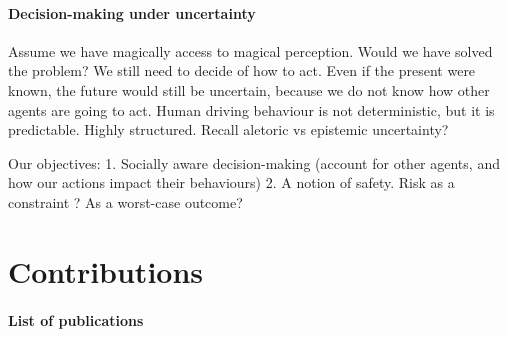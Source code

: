 \paragraph{Decision-making under uncertainty}

Assume we have magically access to magical perception. Would we have solved the problem?
We still need to decide of how to act. Even if the present were known, the future would still be uncertain, because we do not know how other agents are going to act.
Human driving behaviour is not deterministic, but it is predictable. Highly structured.
Recall aletoric vs epistemic uncertainty?

Our objectives: 
1. Socially aware decision-making (account for other agents, and how our actions impact their behaviours)
2. A notion of safety. Risk as a constraint ? As a worst-case outcome?

\section{Contributions}

\paragraph{List of publications}